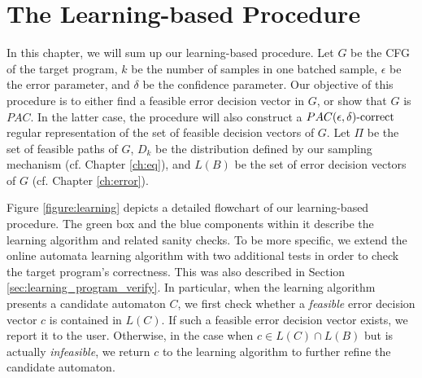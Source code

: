 \chapter{The Learning-based Procedure}\label{ch:learning_proc}

In this chapter, we will sum up our learning-based procedure. Let $G$ be the CFG of the target program, $k$ be the number of samples in one batched sample, $\epsilon$ be the error parameter, and $\delta$ be the confidence parameter. Our objective of this procedure is to either find a feasible error decision vector in $G$, or show that $G$ is $PAC$. In the latter case, the procedure will also construct a $PAC(\epsilon, \delta)\text{-correct}$ regular representation of the set of feasible decision vectors of $G$. Let $\Pi$ be the set of feasible paths of $G$, $D_k$ be the distribution defined by our sampling mechanism (cf. Chapter \ref{ch:eq}), and $L(B)$ be the set of error decision vectors of $G$ (cf. Chapter \ref{ch:error}).

Figure \ref{figure:learning} depicts a detailed flowchart of our learning-based procedure. The green box and the blue components within it describe the learning algorithm and related sanity checks. To be more specific, we extend the online automata learning algorithm with two additional tests in order to check the target program's correctness. This was also described in Section \ref{sec:learning_program_verify}. In particular, when the learning algorithm presents a candidate automaton $C$, we first check whether a \emph{feasible} error decision vector $c$ is contained in $L(C)$. If such a feasible error decision vector exists, we report it to the user. Otherwise, in the case when $c \in L(C) \cap L(B)$ but is actually \emph{infeasible}, we return $c$ to the learning algorithm to further refine the candidate automaton. 

